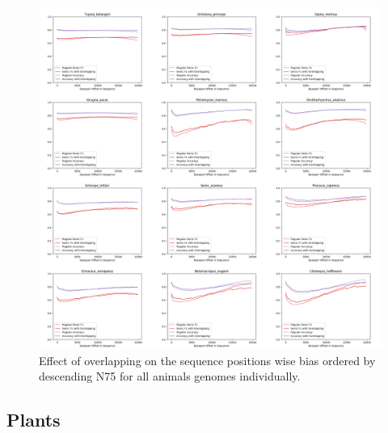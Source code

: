 \documentclass{article}
\begin{document}
\begin{figure}[!h]
\renewcommand\thefigure{S5}
\centerline{\includegraphics[width=1.2\textwidth]{images/overlapping/montage_animals13}}
\caption{Effect of overlapping on the sequence positions wise bias ordered by descending N75 for all animals genomes individually.}
\end{figure}

\clearpage
\subsection{Plants}
\end{document}
